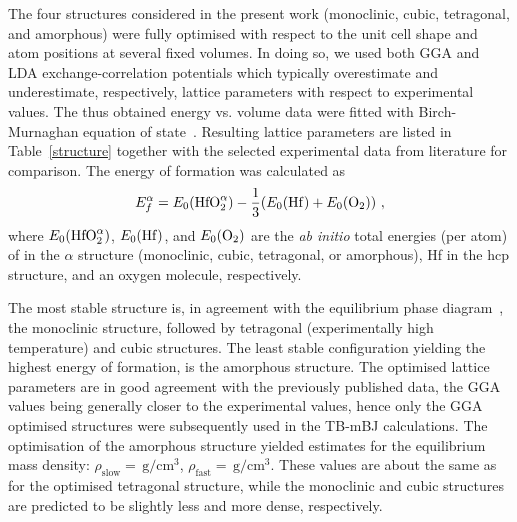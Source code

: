 \documentclass[10pt,a4paper,twocolumn]{article}
\begin{document}
The four structures considered in the present work (monoclinic, cubic, tetragonal, and amorphous) were fully optimised with respect to the unit cell shape and atom positions at several fixed volumes.
In doing so, we used both GGA and LDA exchange-correlation potentials which typically overestimate and underestimate, respectively, lattice parameters with respect to experimental values.
The thus obtained energy vs. volume data were fitted with Birch-Murnaghan equation of state~\cite{Birch1947}.
Resulting lattice parameters are listed in Table~\ref{structure} together with the selected experimental data from literature for comparison.
The energy of formation was calculated as
\begin{equation}
  E_f^\alpha=E_0(\ce{HfO2}^\alpha) - \frac13 (E_0(\ce{Hf}) + E_0(\ce{O2}))\ ,
\end{equation}
where $E_0(\ce{HfO2}^\alpha)$, $E_0(\ce{Hf})$, and $E_0(\ce{O2})$ are the \textit{ab initio} total energies (per atom) of  in the $\alpha$ structure (monoclinic, cubic, tetragonal, or amorphous), Hf in the hcp structure, and an oxygen molecule, respectively.

The most stable structure is, in agreement with the equilibrium phase diagram~\cite{Villars2014-px}, the monoclinic structure, followed by tetragonal (experimentally high temperature) and cubic structures.
The least stable configuration yielding the highest energy of formation, is the amorphous structure.
The optimised lattice parameters are in good agreement with the previously published data, the GGA values being generally closer to the experimental values, hence only the GGA optimised structures were subsequently used in the TB-mBJ calculations.
The optimisation of the amorphous structure yielded estimates for the equilibrium mass density: $\rho_{\mathrm{slow}}=\,\mathrm{g/cm^3}$, $\rho_{\mathrm{fast}}=\,\mathrm{g/cm^3}$. %
These values are about the same as for the optimised tetragonal structure, while the monoclinic and cubic structures are predicted to be slightly less and more dense, respectively.
\end{document}

